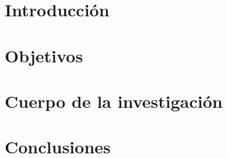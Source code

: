 \documentclass{article}
\begin{document}
    \portada{}
    \newpage

    \section{Introducción}
    
    \newpage

    \section{Objetivos}
    
    \newpage

    \section{Cuerpo de la investigación}
    
    \newpage
    
    \section{Conclusiones}
    
    \newpage

    
\end{document}

